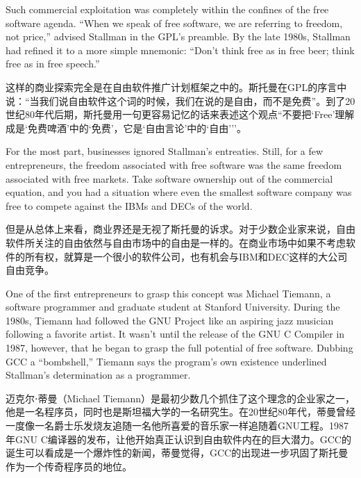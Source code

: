 \ifdefined\eng
Such commercial exploitation was completely within the confines of the free software agenda. ``When we speak of free software, we are referring to freedom, not price,'' advised Stallman in the GPL's preamble. By the late 1980s, Stallman had refined it to a more simple mnemonic: ``Don't think free as in free beer; think free as in free speech.''
\fi

\ifdefined\chs
这样的商业探索完全是在自由软件推广计划框架之中的。斯托曼在GPL的序言中说：``当我们说自由软件这个词的时候，我们在说的是自由，而不是免费''。到了20世纪80年代后期，斯托曼用一句更容易记忆的话来表述这个观点``不要把`Free'理解成是`免费啤酒'中的`免费'，它是`自由言论'中的`自由'\hspace{0.01in}''。
\fi

\ifdefined\eng
For the most part, businesses ignored Stallman's entreaties. Still, for a few entrepreneurs, the freedom associated with free software was the same freedom associated with free markets. Take software ownership out of the commercial equation, and you had a situation where even the smallest software company was free to compete against the IBMs and DECs of the world.
\fi

\ifdefined\chs
但是从总体上来看，商业界还是无视了斯托曼的诉求。对于少数企业家来说，自由软件所关注的自由依然与自由市场中的自由是一样的。在商业市场中如果不考虑软件的所有权，就算是一个很小的软件公司，也有机会与IBM和DEC这样的大公司自由竞争。
\fi

\ifdefined\eng
One of the first entrepreneurs to grasp this concept was Michael Tiemann, a software programmer and graduate student at Stanford University. During the 1980s, Tiemann had followed the GNU Project like an aspiring jazz musician following a favorite artist. It wasn't until the release of the GNU C Compiler in 1987, however, that he began to grasp the full potential of free software. Dubbing GCC a ``bombshell,'' Tiemann says the program's own existence underlined Stallman's determination as a programmer.
\fi

\ifdefined\chs
迈克尔⋅蒂曼（Michael Tiemann）是最初少数几个抓住了这个理念的企业家之一，他是一名程序员，同时也是斯坦福大学的一名研究生。在20世纪80年代，蒂曼曾经一度像一名爵士乐发烧友追随一名他所喜爱的音乐家一样追随着GNU工程。1987年GNU C编译器的发布，让他开始真正认识到自由软件内在的巨大潜力。GCC的诞生可以看成是一个爆炸性的新闻，蒂曼觉得，GCC的出现进一步巩固了斯托曼作为一个传奇程序员的地位。
\fi

